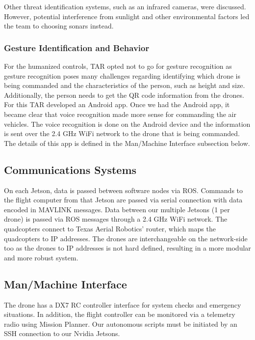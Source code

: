 \documentclass[12pt,letterpaper]{article}
\begin{document}
			Other threat identification systems, such as an infrared cameras, were discussed. However, potential interference from sunlight and other environmental factors led the team to choosing sonars instead.

		\subsubsection*{Gesture Identification and Behavior}
		For the humanized controls, TAR opted not to go for gesture recognition as gesture recognition poses many challenges regarding identifying which drone is being commanded and the characteristics of the person, such as height and size. Additionally, the person needs to get the QR code information from the drones. For this TAR developed an Android app. Once we had the Android app, it became clear that voice recognition made more sense for commanding the air vehicles. The voice recognition is done on the Android device and the information is sent over the 2.4 GHz WiFi network to the drone that is being commanded. The details of this app is defined in the Man/Machine Interface subsection below. 

		\subsection*{Communications Systems}
		On each Jetson, data is passed between software nodes via ROS. Commands to the flight computer from that Jetson are passed via serial connection with data encoded in MAVLINK messages. Data between our multiple Jetsons (1 per drone) is passed via ROS messages through a 2.4 GHz WiFi network. The quadcopters connect to Texas Aerial Robotics’ router, which maps the quadcopters to IP addresses. The drones are interchangeable on the network-side too as the drones to IP addresses is not hard defined, resulting in a more modular and more robust system. 

		\subsection*{Man/Machine Interface}
		The drone has a DX7 RC controller interface for system checks and emergency situations. In addition, the flight controller can be monitored via a telemetry radio using Mission Planner. Our autonomous scripts must be initiated by an SSH connection to our Nvidia Jetsons.
\end{document}
